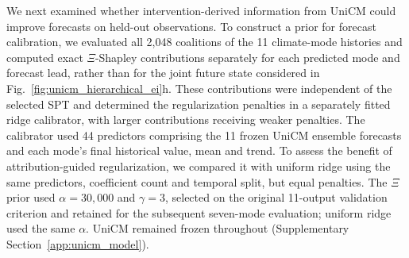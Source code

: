 \documentclass[fleqn,10pt]{wlscirep}
\theoremstyle{naturetheorem}
\begin{document}
We next examined whether intervention-derived information from UniCM could improve forecasts on held-out observations. To construct a prior for forecast calibration, we evaluated all 2,048 coalitions of the 11 climate-mode histories and computed exact $\Xi$-Shapley contributions separately for each predicted mode and forecast lead, rather than for the joint future state considered in Fig.~\ref{fig:unicm_hierarchical_ei}h. These contributions were independent of the selected SPT and determined the regularization penalties in a separately fitted ridge calibrator, with larger contributions receiving weaker penalties. The calibrator used 44 predictors comprising the 11 frozen UniCM ensemble forecasts and each mode's final historical value, mean and trend. To assess the benefit of attribution-guided regularization, we compared it with uniform ridge using the same predictors, coefficient count and temporal split, but equal penalties. The $\Xi$ prior used $\alpha=30{,}000$ and $\gamma=3$, selected on the original 11-output validation criterion and retained for the subsequent seven-mode evaluation; uniform ridge used the same $\alpha$. UniCM remained frozen throughout (Supplementary Section~\ref{app:unicm_model}).





\end{document}
